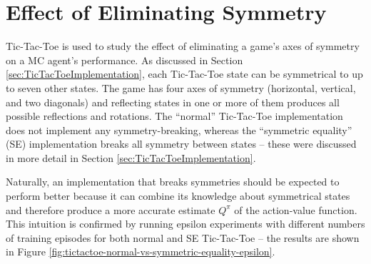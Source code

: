\documentclass[11pt,a4paper]{report}
\begin{document}
\section{Effect of Eliminating Symmetry}
\label{sec:eliminate-symmetry}

Tic-Tac-Toe is used to study the effect of eliminating a game's axes of symmetry on a MC agent's performance. As discussed in Section \ref{sec:TicTacToeImplementation}, each Tic-Tac-Toe state can be symmetrical to up to seven other states. The game has four axes of symmetry (horizontal, vertical, and two diagonals) and reflecting states in one or more of them produces all possible reflections and rotations. The ``normal'' Tic-Tac-Toe implementation does not implement any symmetry-breaking, whereas the ``symmetric equality'' (SE) implementation breaks all symmetry between states -- these were discussed in more detail in Section \ref{sec:TicTacToeImplementation}.

Naturally, an implementation that breaks symmetries should be expected to perform better because it can combine its knowledge about symmetrical states and therefore produce a more accurate estimate $Q^{\pi}$ of the action-value function. This intuition is confirmed by running epsilon experiments with different numbers of training episodes for both normal and SE Tic-Tac-Toe -- the results are shown in Figure \ref{fig:tictactoe-normal-vs-symmetric-equality-epsilon}.
\end{document}
